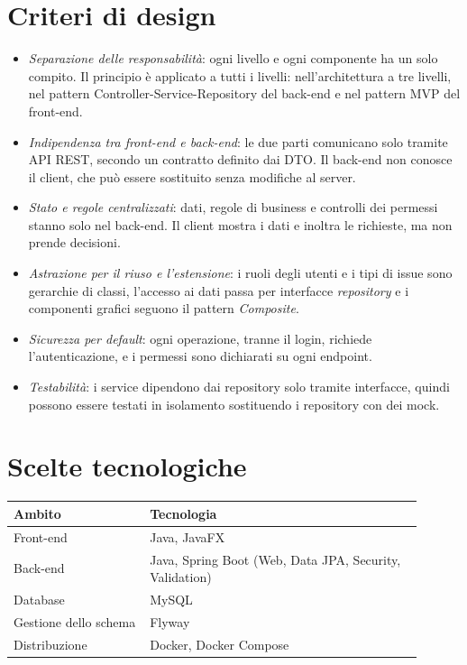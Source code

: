 \section{Criteri di design}
\begin{itemize}
  \item \textit{Separazione delle responsabilità}: ogni livello e ogni componente ha un solo compito. Il principio è applicato a tutti i livelli: nell'architettura a tre livelli, nel pattern Controller-Service-Repository del back-end e nel pattern MVP del front-end.
  \item \textit{Indipendenza tra front-end e back-end}: le due parti comunicano solo tramite API REST, secondo un contratto definito dai DTO. Il back-end non conosce il client, che può essere sostituito senza modifiche al server.
  \item \textit{Stato e regole centralizzati}: dati, regole di business e controlli dei permessi stanno solo nel back-end. Il client mostra i dati e inoltra le richieste, ma non prende decisioni.
  \item \textit{Astrazione per il riuso e l'estensione}: i ruoli degli utenti e i tipi di issue sono gerarchie di classi, l'accesso ai dati passa per interfacce \textit{repository} e i componenti grafici seguono il pattern \textit{Composite}.
  \item \textit{Sicurezza per default}: ogni operazione, tranne il login, richiede l'autenticazione, e i permessi sono dichiarati su ogni endpoint.
  \item \textit{Testabilità}: i service dipendono dai repository solo tramite interfacce, quindi possono essere testati in isolamento sostituendo i repository con dei mock.
\end{itemize}


\section{Scelte tecnologiche}

\begin{center}
\renewcommand{\arraystretch}{1.4}
\begin{tabular}{|p{0.3\linewidth}|p{0.6\linewidth}|}
\hline
\textbf{Ambito} & \textbf{Tecnologia} \\
\hline
Front-end & Java, JavaFX \\
Back-end & Java, Spring Boot (Web, Data JPA, Security, Validation) \\
Database & MySQL \\
Gestione dello schema & Flyway \\
Distribuzione & Docker, Docker Compose \\
\hline
\end{tabular}
\end{center}

